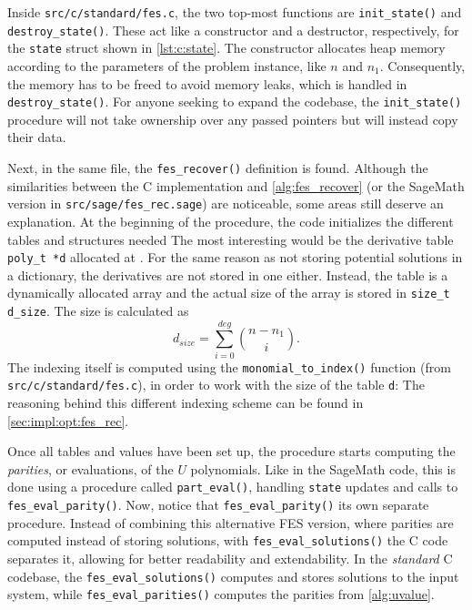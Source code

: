 Inside \texttt{src/c/standard/fes.c}, the two top-most functions are \texttt{init\_state()} and \texttt{destroy\_state()}. These act like a constructor and a destructor, respectively, for the \texttt{state} struct shown in \cref{lst:c:state}. The constructor allocates heap memory according to the parameters of the problem instance, like $n$ and $n_1$. Consequently, the memory has to be freed to avoid memory leaks, which is handled in \texttt{destroy\_state()}. For anyone seeking to expand the codebase, the \texttt{init\_state()} procedure will not take ownership over any passed pointers but will instead copy their data.

Next, in the same file, the \texttt{fes\_recover()} definition is found. Although the similarities between the C implementation and \cref{alg:fes_recover} (or the SageMath version in \texttt{src/sage/fes\_rec.sage}) are noticeable, some areas still deserve an explanation. At the beginning of the procedure, the code initializes the different tables and structures needed
The most interesting would be the derivative table \texttt{poly\_t *d} allocated at . For the same reason as not storing potential solutions in a dictionary, the derivatives are not stored in one either. Instead, the table is a dynamically allocated array and the actual size of the array is stored in \texttt{size\_t d\_size}. The size is calculated as 
\begin{equation}
    d_{size} = \sum_{i = 0}^{deg} \binom{n - n_1}{i}.
\end{equation}
The indexing itself is computed using the \texttt{monomial\_to\_index()} function (from \texttt{src/c/standard/fes.c}), in order to work with the size of the table \texttt{d}:
The reasoning behind this different indexing scheme can be found in \cref{sec:impl:opt:fes_rec}.

Once all tables and values have been set up, the procedure starts computing the \textit{parities}, or evaluations, of the $U$ polynomials. Like in the SageMath code, this is done using a procedure called \texttt{part\_eval()}, handling \texttt{state} updates and calls to \texttt{fes\_eval\_parity()}. Now, notice that \texttt{fes\_eval\_parity()} its own separate procedure. Instead of combining this alternative FES version, where parities are computed instead of storing solutions, with \texttt{fes\_eval\_solutions()} the C code separates it, allowing for better readability and extendability. In the \textit{standard} C codebase, the \texttt{fes\_eval\_solutions()} computes and stores solutions to the input system, while \texttt{fes\_eval\_parities()} computes the parities from \cref{alg:uvalue}.

